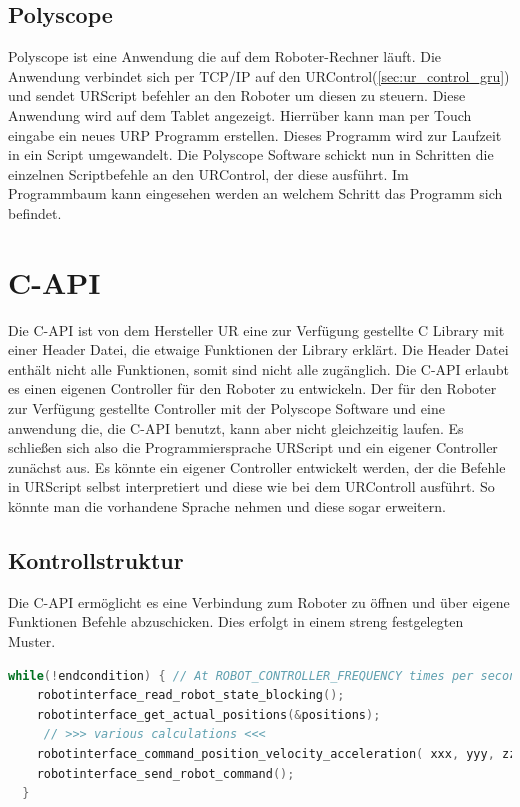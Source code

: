 \subsection{Polyscope}
\label{urcontrol_polyscope_gru}

Polyscope ist eine Anwendung die auf dem Roboter-Rechner läuft. Die Anwendung verbindet sich per \ac{TCP/IP} auf den URControl(\ref{sec:ur_control_gru}) und sendet URScript befehler an den Roboter um diesen zu steuern.
Diese Anwendung wird auf dem Tablet angezeigt. Hierrüber kann man per Touch eingabe ein neues \ac{URP} Programm erstellen. Dieses Programm wird zur Laufzeit in ein Script umgewandelt. Die Polyscope Software schickt nun in Schritten die einzelnen Scriptbefehle an den URControl, der diese ausführt. Im Programmbaum kann eingesehen werden an welchem Schritt das Programm sich befindet.

\section{C-API}
\label{sec:rest_prinzip_gru}

Die C-\ac{API} ist von dem Hersteller \ac{UR} eine zur Verfügung gestellte C \ac{Library} mit einer Header Datei, die etwaige Funktionen der Library erklärt. Die Header Datei enthält nicht alle Funktionen, somit sind nicht alle zugänglich. Die C-\ac{API} erlaubt es einen eigenen Controller für den Roboter zu entwickeln. Der für den Roboter zur Verfügung gestellte Controller mit der Polyscope Software und eine anwendung die, die C-\ac{API} benutzt, kann aber nicht gleichzeitig laufen. Es schließen sich also die Programmiersprache URScript  und ein eigener Controller zunächst aus. Es könnte ein eigener Controller entwickelt werden, der die Befehle in URScript selbst interpretiert und diese wie bei dem URControll ausführt. So könnte man die vorhandene Sprache nehmen und diese sogar erweitern.

\subsection{Kontrollstruktur}
\label{capi_control_loop_gru}	

Die C-\ac{API} ermöglicht es eine Verbindung zum Roboter zu öffnen und über eigene Funktionen Befehle abzuschicken. Dies erfolgt in einem streng festgelegten Muster.

\begin{lstlisting}[language=C,caption={Beispiel der Kontroll Struktur}, label=lst:robot_control_loop,captionpos=b]
  while(!endcondition) { // At ROBOT_CONTROLLER_FREQUENCY times per second
    robotinterface_read_robot_state_blocking();
    robotinterface_get_actual_positions(&positions);
     // >>> various calculations <<<
    robotinterface_command_position_velocity_acceleration( xxx, yyy, zzz);
    robotinterface_send_robot_command();
  }
\end{lstlisting}

